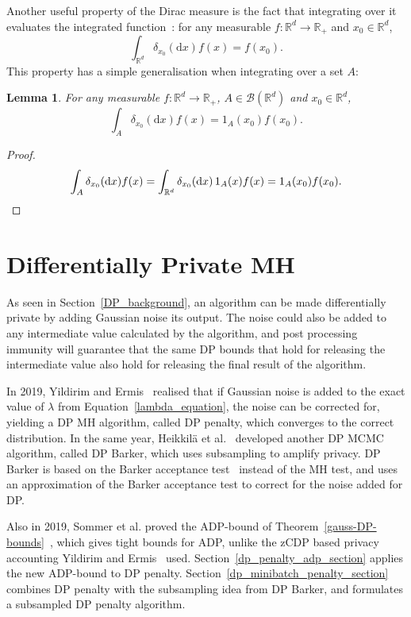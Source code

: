 \documentclass[english,twoside,openright]{HYgraduMLDS}
\newtheorem{lemma}{Lemma}[chapter]
\newcommand{\R}{\mathbb{R}}
\newcommand{\dx}{\mathrm{d}}
\begin{document}
Another useful property of the Dirac measure is the fact that integrating
over it evaluates the integrated function~\cite{Cin11}: for any measurable
\(f\colon \R^{d}\to \R_{+}\) and \(x_{0}\in \R^{d}\),
\[
  \int_{\R^{d}}\delta_{x_{0}}(\dx x)f(x) = f(x_{0}).
\]
This property has a simple generalisation when integrating over a set \(A\):
\begin{lemma}\label{dirac_evaluation_lemma}
	For any measurable \(f\colon \R^{d}\to \R_{+}\), \(A\in \mathcal{B}(\R^{d})\)
  and \(x_{0}\in \R^{d}\),
  \[
    \int_{A}\delta_{x_{0}}(\dx x)f(x) = 1_{A}(x_{0})f(x_{0}).
  \]
\end{lemma}
\begin{proof}
  \[
    \int_{A}\delta_{x_{0}}(\dx x)f(x)
    = \int_{\R^{d}}\delta_{x_{0}}(\dx x)\, 1_{A}(x)f(x)
    = 1_{A}(x_{0})f(x_{0}).
    \qedhere
  \]
\end{proof}

\chapter{Differentially Private MH}\label{dp_mcmc_chapter}

As seen in Section~\ref{DP_background}, an algorithm can be made differentially 
private by adding Gaussian noise its output. The noise could also be added
to any intermediate value calculated by the algorithm, and post processing immunity 
will guarantee that the same DP bounds that hold for releasing the intermediate 
value also hold for releasing the final result of the algorithm.

In 2019, Yildirim and Ermis~\cite{YildirimE19} realised that if Gaussian noise
is added to the exact value of \(\lambda\) from Equation~\ref{lambda_equation},
the noise can be corrected for,
yielding a DP MH algorithm, called DP penalty,
which converges to 
the correct distribution. In the same year, Heikkilä et al.~\cite{HeikkilaJDH19}
developed another DP MCMC algorithm, called DP Barker, which uses subsampling 
to amplify privacy. DP Barker is based on the Barker acceptance
test~\cite{Barker65} instead of the MH test, and uses an approximation
of the Barker acceptance test to correct for the noise added for DP.

Also in 2019, Sommer et al. proved the ADP-bound of
Theorem~\ref{gauss-DP-bounds}~\cite{Sommer2019}, which gives tight bounds for
ADP, unlike the zCDP based privacy accounting Yildirim and
Ermis~\cite{YildirimE19} used. Section~\ref{dp_penalty_adp_section} applies
the new ADP-bound to DP penalty.
Section~\ref{dp_minibatch_penalty_section} combines DP penalty with the
subsampling idea from DP Barker, and formulates a subsampled DP penalty
algorithm.
\end{document}
